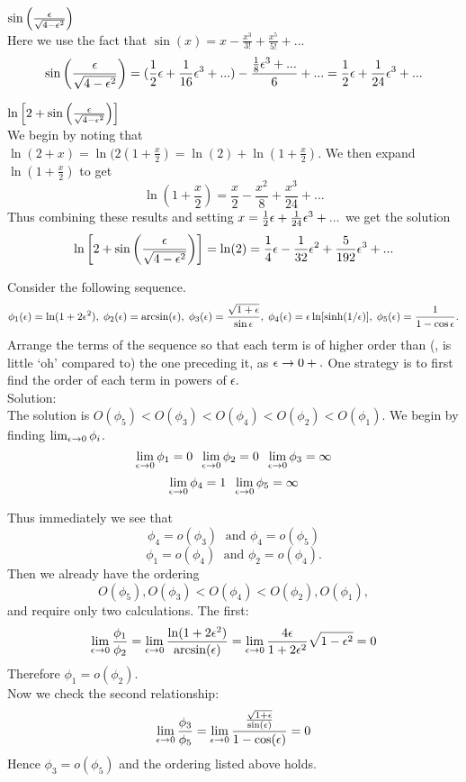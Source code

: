     \item $\sin \left(\frac{\epsilon}{\sqrt{4-\epsilon^2}}\right)$\\
    Here we use the fact that $\sin(x)=x-\frac{x^3}{3!}+\frac{x^5}{5!}+...$
    $$\sin \left(\frac{\epsilon}{\sqrt{4-\epsilon^2}}\right)=(\frac{1}{2}\epsilon+\frac{1}{16}\epsilon^3+...)-\frac{\frac{1}{8}\epsilon^3+...}{6}+...=\frac{1}{2}\epsilon+\frac{1}{24}\epsilon^3+...$$

    \item $\ln \left[2 +  \sin \left(\frac{\epsilon}{\sqrt{4-\epsilon^2}}\right) \right]$\\
    We begin by noting that $\ln(2+x)=\ln(2(1+\frac{x}{2})=\ln(2)+\ln(1+\frac{x}{2}).$ We then expand $\ln(1+\frac{x}{2})$ to get
    $$\ln(1+\frac{x}{2})=\frac{x}{2}-\frac{x^2}{8}+\frac{x^3}{24}+...$$
    Thus combining these results and setting $x=\frac{1}{2}\epsilon+\frac{1}{24}\epsilon^3+...$ we get the solution
    $$\ln \left[2 +  \sin \left(\frac{\epsilon}{\sqrt{4-\epsilon^2}}\right) \right]=\ln(2)=\frac{1}{4}\epsilon-\frac{1}{32}\epsilon^2+\frac{5}{192}\epsilon^3+...$$
    \eenum
\item Consider the following sequence.
\begin{equation*}
\phi_1(\epsilon) = \ln(1+2\epsilon^2), \; \phi_2(\epsilon) = \arcsin (\epsilon), \; \phi_3(\epsilon) = \frac{\sqrt{1+\epsilon}}{\sin \epsilon}, \;
	\phi_4(\epsilon) = \epsilon \ln [\sinh(1/\epsilon)], \; \phi_5(\epsilon) = \frac{1}{1-\cos \epsilon}.
\end{equation*}
Arrange the terms of the sequence so that each term is of higher order than (\ie, is little `oh' compared to) the one preceding it, as $\epsilon \to 0+.$  One strategy is to first find the order of each term in powers of $\epsilon.$\\

Solution:\\

The solution is $O(\phi_5)<O(\phi_3)<O(\phi_4)<O(\phi_2)<O(\phi_1)$.
We begin by finding $\lim_{\epsilon\to 0}\phi_i$.
$$\lim_{\epsilon\to 0}\phi_1=0\;\;\lim_{\epsilon\to 0}\phi_2=0\;\;\lim_{\epsilon\to 0}\phi_3=\infty$$
$$\lim_{\epsilon\to 0}\phi_4=1\;\; \lim_{\epsilon\to 0}\phi_5=\infty$$

Thus immediately we see that
$$\phi_4=o(\phi_3)\;\text{ and }\phi_4=o(\phi_5)$$
$$\phi_1=o(\phi_4)\;\text{ and }\phi_2=o(\phi_4).$$
Then we already have the ordering
$$O(\phi_5),O(\phi_3)<O(\phi_4)<O(\phi_2),O(\phi_1),$$
and require only two calculations.
The first:
$$\lim_{\epsilon\to 0}\frac{\phi_1}{\phi_2}=\lim_{\epsilon\to 0}\frac{\ln(1+2\epsilon^2)}{\arcsin(\epsilon)}=\lim_{\epsilon\to 0}\frac{4\epsilon}{1+2\epsilon^2}\sqrt{1-\epsilon^2}=0$$
Therefore $\phi_1=o(\phi_2)$. \\
Now we check the second relationship:
$$\lim_{\epsilon\to 0}\frac{\phi_3}{\phi_5}=\lim_{\epsilon\to 0}\frac{\frac{\sqrt{1+\epsilon}}{\sin(\epsilon)}}{1-\cos(\epsilon)}=0$$
Hence $\phi_3=o(\phi_5)$ and the ordering listed above holds.
\eenum
 